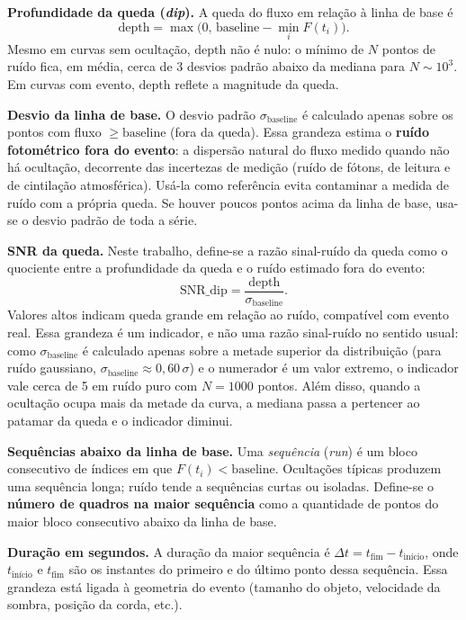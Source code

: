 \textbf{Profundidade da queda (\textit{dip}).} A queda do fluxo em relação à linha de base é
\begin{equation}
\mathrm{depth} = \max\big(0,\, \mathrm{baseline} - \min_i F(t_i)\big).
\end{equation}
Mesmo em curvas sem ocultação, \(\mathrm{depth}\) não é nulo: o mínimo de \(N\) pontos de ruído fica, em média, cerca de 3 desvios padrão abaixo da mediana para \(N \sim 10^3\). Em curvas com evento, \(\mathrm{depth}\) reflete a magnitude da queda.

\textbf{Desvio da linha de base.} O desvio padrão \(\sigma_{\mathrm{baseline}}\) é calculado apenas sobre os pontos com fluxo \(\geq \mathrm{baseline}\) (fora da queda). Essa grandeza estima o \textbf{ruído fotométrico fora do evento}: a dispersão natural do fluxo medido quando não há ocultação, decorrente das incertezas de medição (ruído de fótons, de leitura e de cintilação atmosférica). Usá-la como referência evita contaminar a medida de ruído com a própria queda. Se houver poucos pontos acima da linha de base, usa-se o desvio padrão de toda a série.

\textbf{SNR da queda.} Neste trabalho, define-se a razão sinal-ruído da queda como o quociente entre a profundidade da queda e o ruído estimado fora do evento:
\begin{equation}
\mathrm{SNR\_dip} = \frac{\mathrm{depth}}{\sigma_{\mathrm{baseline}}}.
\end{equation}
Valores altos indicam queda grande em relação ao ruído, compatível com evento real. Essa grandeza é um indicador, e não uma razão sinal-ruído no sentido usual: como \(\sigma_{\mathrm{baseline}}\) é calculado apenas sobre a metade superior da distribuição (para ruído gaussiano, \(\sigma_{\mathrm{baseline}} \approx 0{,}60\,\sigma\)) e o numerador é um valor extremo, o indicador vale cerca de 5 em ruído puro com \(N = 1000\) pontos. Além disso, quando a ocultação ocupa mais da metade da curva, a mediana passa a pertencer ao patamar da queda e o indicador diminui.

\textbf{Sequências abaixo da linha de base.} Uma \textit{sequência} (\textit{run}) é um bloco consecutivo de índices em que \(F(t_i) < \mathrm{baseline}\). Ocultações típicas produzem uma sequência longa; ruído tende a sequências curtas ou isoladas. Define-se o \textbf{número de quadros na maior sequência} como a quantidade de pontos do maior bloco consecutivo abaixo da linha de base.

\textbf{Duração em segundos.} A duração da maior sequência é \(\Delta t = t_{\mathrm{fim}} - t_{\text{início}}\), onde \(t_{\text{início}}\) e \(t_{\mathrm{fim}}\) são os instantes do primeiro e do último ponto dessa sequência. Essa grandeza está ligada à geometria do evento (tamanho do objeto, velocidade da sombra, posição da corda, etc.).


